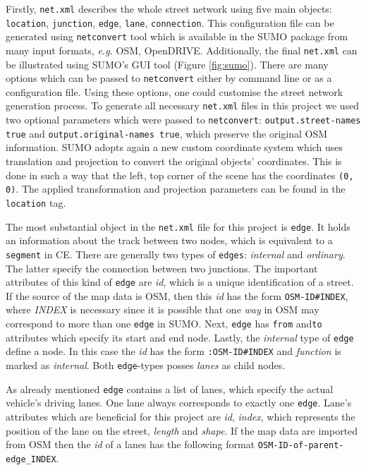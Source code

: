 Firstly, \texttt{net.xml} describes the whole street network using five main objects: \texttt{location}, \texttt{junction}, \texttt{edge}, \texttt{lane}, \texttt{connection}. This configuration file can be generated using \texttt{netconvert} tool which is available in the SUMO package from many input formats, \emph{e.g.} OSM, OpenDRIVE. Additionally, the final \texttt{net.xml} can be illustrated using SUMO's GUI tool (Figure \ref{fig:sumo}). There are many options which can be passed to \texttt{netconvert} either by command line or as a configuration file. Using these options, one could customise the street network generation process. To generate all necessary \texttt{net.xml} files in this project we used two optional parameters which were passed to \texttt{netconvert}: \texttt{output.street-names true} and \texttt{output.original-names true}, which preserve the original OSM information. SUMO adopts again a new custom coordinate system which uses translation and projection to convert the original objects' coordinates. This is done in such a way that the left, top corner of the scene has the coordinates \texttt{(0, 0)}. The applied transformation and projection parameters can be found in the \texttt{location} tag.

The most substantial object in the \texttt{net.xml} file for this project is \texttt{edge}. It holds an information about the track between two nodes, which is equivalent to a \texttt{segment} in CE. There are generally two types of \texttt{edges}: \emph{internal} and \emph{ordinary}. The latter specify the connection between two junctions. The important attributes of this kind of \texttt{edge} are \emph{id}, which is a unique identification of a street. If the source of the map data is OSM, then this \emph{id} has the form \texttt{OSM-ID\#INDEX}, where \emph{INDEX} is necessary since it is possible that one \emph{way} in OSM may correspond to more than one \texttt{edge} in SUMO. Next, \texttt{edge} has \texttt{from} and\texttt{to} attributes which specify its start and end node. Lastly, the \emph{internal} type of \texttt{edge} define a node. In this case the \emph{id} has the form \texttt{:OSM-ID\#INDEX} and \emph{function} is marked as \emph{internal}. Both \texttt{edge}-types posses \emph{lanes} as child nodes.

As already mentioned \texttt{edge} contains a list of lanes, which specify the actual vehicle's driving lanes. One lane always corresponds to exactly one \texttt{edge}. Lane's attributes which are beneficial for this project are \emph{id}, \emph{index}, which represents the position of the lane on the street, \emph{length} and \emph{shape}. If the map data are imported from OSM then the \emph{id} of a lanes has the following format \texttt{OSM-ID-of-parent-edge\_INDEX}. 

